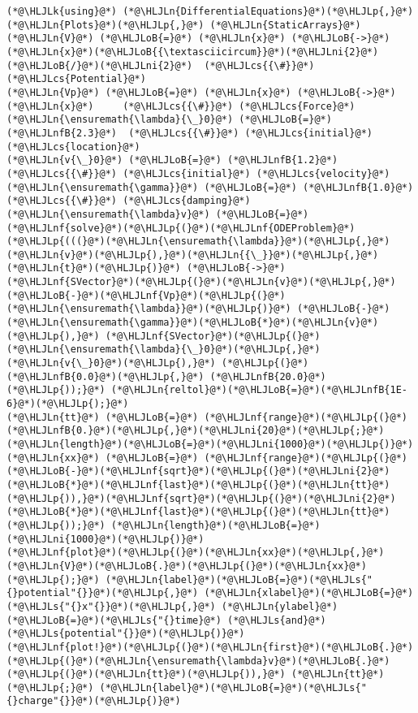 \documentclass[12pt,landscape]{article}
\newcommand{\HLJLk}[1]{\textcolor[RGB]{148,91,176}{\textbf{#1}}}
\newcommand{\HLJLn}[1]{#1}
\newcommand{\HLJLnf}[1]{\textcolor[RGB]{66,102,213}{#1}}
\newcommand{\HLJLs}[1]{\textcolor[RGB]{201,61,57}{#1}}
\newcommand{\HLJLnfB}[1]{\textcolor[RGB]{59,151,46}{#1}}
\newcommand{\HLJLni}[1]{\textcolor[RGB]{59,151,46}{#1}}
\newcommand{\HLJLoB}[1]{\textcolor[RGB]{102,102,102}{\textbf{#1}}}
\newcommand{\HLJLp}[1]{#1}
\newcommand{\HLJLcs}[1]{\textcolor[RGB]{153,153,119}{\textit{#1}}}
\begin{document}
{\begin{lstlisting}
(*@\HLJLk{using}@*) (*@\HLJLn{DifferentialEquations}@*)(*@\HLJLp{,}@*) (*@\HLJLn{Plots}@*)(*@\HLJLp{,}@*) (*@\HLJLn{StaticArrays}@*)
(*@\HLJLn{V}@*) (*@\HLJLoB{=}@*) (*@\HLJLn{x}@*) (*@\HLJLoB{->}@*) (*@\HLJLn{x}@*)(*@\HLJLoB{{\textasciicircum}}@*)(*@\HLJLni{2}@*)(*@\HLJLoB{/}@*)(*@\HLJLni{2}@*)  (*@\HLJLcs{{\#}}@*) (*@\HLJLcs{Potential}@*)
(*@\HLJLn{Vp}@*) (*@\HLJLoB{=}@*) (*@\HLJLn{x}@*) (*@\HLJLoB{->}@*) (*@\HLJLn{x}@*)     (*@\HLJLcs{{\#}}@*) (*@\HLJLcs{Force}@*)
(*@\HLJLn{\ensuremath{\lambda}{\_}0}@*) (*@\HLJLoB{=}@*) (*@\HLJLnfB{2.3}@*)  (*@\HLJLcs{{\#}}@*) (*@\HLJLcs{initial}@*) (*@\HLJLcs{location}@*)
(*@\HLJLn{v{\_}0}@*) (*@\HLJLoB{=}@*) (*@\HLJLnfB{1.2}@*)  (*@\HLJLcs{{\#}}@*) (*@\HLJLcs{initial}@*) (*@\HLJLcs{velocity}@*)
(*@\HLJLn{\ensuremath{\gamma}}@*) (*@\HLJLoB{=}@*) (*@\HLJLnfB{1.0}@*)    (*@\HLJLcs{{\#}}@*) (*@\HLJLcs{damping}@*)
(*@\HLJLn{\ensuremath{\lambda}v}@*) (*@\HLJLoB{=}@*) (*@\HLJLnf{solve}@*)(*@\HLJLp{(}@*)(*@\HLJLnf{ODEProblem}@*)(*@\HLJLp{(((}@*)(*@\HLJLn{\ensuremath{\lambda}}@*)(*@\HLJLp{,}@*)(*@\HLJLn{v}@*)(*@\HLJLp{),}@*)(*@\HLJLn{{\_}}@*)(*@\HLJLp{,}@*)(*@\HLJLn{t}@*)(*@\HLJLp{)}@*) (*@\HLJLoB{->}@*) (*@\HLJLnf{SVector}@*)(*@\HLJLp{(}@*)(*@\HLJLn{v}@*)(*@\HLJLp{,}@*)(*@\HLJLoB{-}@*)(*@\HLJLnf{Vp}@*)(*@\HLJLp{(}@*)(*@\HLJLn{\ensuremath{\lambda}}@*)(*@\HLJLp{)}@*) (*@\HLJLoB{-}@*) (*@\HLJLn{\ensuremath{\gamma}}@*)(*@\HLJLoB{*}@*)(*@\HLJLn{v}@*)(*@\HLJLp{),}@*) (*@\HLJLnf{SVector}@*)(*@\HLJLp{(}@*)(*@\HLJLn{\ensuremath{\lambda}{\_}0}@*)(*@\HLJLp{,}@*)(*@\HLJLn{v{\_}0}@*)(*@\HLJLp{),}@*) (*@\HLJLp{(}@*)(*@\HLJLnfB{0.0}@*)(*@\HLJLp{,}@*) (*@\HLJLnfB{20.0}@*)(*@\HLJLp{));}@*) (*@\HLJLn{reltol}@*)(*@\HLJLoB{=}@*)(*@\HLJLnfB{1E-6}@*)(*@\HLJLp{);}@*)
(*@\HLJLn{tt}@*) (*@\HLJLoB{=}@*) (*@\HLJLnf{range}@*)(*@\HLJLp{(}@*)(*@\HLJLnfB{0.}@*)(*@\HLJLp{,}@*)(*@\HLJLni{20}@*)(*@\HLJLp{;}@*) (*@\HLJLn{length}@*)(*@\HLJLoB{=}@*)(*@\HLJLni{1000}@*)(*@\HLJLp{)}@*)
(*@\HLJLn{xx}@*) (*@\HLJLoB{=}@*) (*@\HLJLnf{range}@*)(*@\HLJLp{(}@*)(*@\HLJLoB{-}@*)(*@\HLJLnf{sqrt}@*)(*@\HLJLp{(}@*)(*@\HLJLni{2}@*)(*@\HLJLoB{*}@*)(*@\HLJLnf{last}@*)(*@\HLJLp{(}@*)(*@\HLJLn{tt}@*)(*@\HLJLp{)),}@*)(*@\HLJLnf{sqrt}@*)(*@\HLJLp{(}@*)(*@\HLJLni{2}@*)(*@\HLJLoB{*}@*)(*@\HLJLnf{last}@*)(*@\HLJLp{(}@*)(*@\HLJLn{tt}@*)(*@\HLJLp{));}@*) (*@\HLJLn{length}@*)(*@\HLJLoB{=}@*)(*@\HLJLni{1000}@*)(*@\HLJLp{)}@*)
(*@\HLJLnf{plot}@*)(*@\HLJLp{(}@*)(*@\HLJLn{xx}@*)(*@\HLJLp{,}@*) (*@\HLJLn{V}@*)(*@\HLJLoB{.}@*)(*@\HLJLp{(}@*)(*@\HLJLn{xx}@*)(*@\HLJLp{);}@*) (*@\HLJLn{label}@*)(*@\HLJLoB{=}@*)(*@\HLJLs{"{}potential"{}}@*)(*@\HLJLp{,}@*) (*@\HLJLn{xlabel}@*)(*@\HLJLoB{=}@*)(*@\HLJLs{"{}x"{}}@*)(*@\HLJLp{,}@*) (*@\HLJLn{ylabel}@*)(*@\HLJLoB{=}@*)(*@\HLJLs{"{}time}@*) (*@\HLJLs{and}@*) (*@\HLJLs{potential"{}}@*)(*@\HLJLp{)}@*)
(*@\HLJLnf{plot!}@*)(*@\HLJLp{(}@*)(*@\HLJLn{first}@*)(*@\HLJLoB{.}@*)(*@\HLJLp{(}@*)(*@\HLJLn{\ensuremath{\lambda}v}@*)(*@\HLJLoB{.}@*)(*@\HLJLp{(}@*)(*@\HLJLn{tt}@*)(*@\HLJLp{)),}@*) (*@\HLJLn{tt}@*)(*@\HLJLp{;}@*) (*@\HLJLn{label}@*)(*@\HLJLoB{=}@*)(*@\HLJLs{"{}charge"{}}@*)(*@\HLJLp{)}@*)
\end{lstlisting}

}
\end{document}
